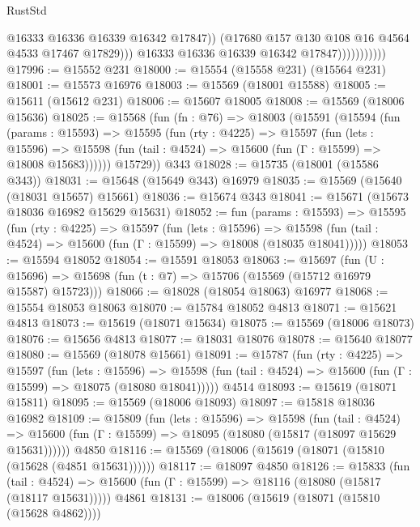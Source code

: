 \begin{lexlean}{RustStd}
\begin{coremodule}
{\begin{coremodule}
{{{{{{{{{{{{{{{{{{{{{{{{{{{{{{{{{{{{{{{{{{{{{{{{{{{{{{{{{{{{                                  @16333
                                  @16336
                                  @16339
                                  @16342
                                  @17847))
                              (@17680 @157 @130 @108 @16 @4564 @4533 @17467 @17829)))
                          @16333
                          @16336
                          @16339
                          @16342
                          @17847)))))))))))
@17996 := @15552 @231
@18000 := @15554 (@15558 @231) (@15564 @231)
@18001 := @15573 @16976
@18003 := @15569 (@18001 @15588)
@18005 := @15611 (@15612 @231)
@18006 := @15607 @18005
@18008 := @15569 (@18006 @15636)
@18025 := @15568
    (fun (fn : @76) =>
    @18003
      (@15591
        (@15594
          (fun (params : @15593) =>
          @15595
            (fun (rty : @4225) =>
            @15597
              (fun (lets : @15596) =>
              @15598 (fun (tail : @4524) => @15600 (fun (Γ : @15599) => @18008 @15683))))))
        @15729))
    @343
@18028 := @15735 (@18001 (@15586 @343))
@18031 := @15648 (@15649 @343) @16979
@18035 := @15569 (@15640 (@18031 @15657) @15661)
@18036 := @15674 @343
@18041 := @15671 (@15673 @18036 @16982 @15629 @15631)
@18052 := fun (params : @15593) =>
  @15595
    (fun (rty : @4225) =>
    @15597
      (fun (lets : @15596) =>
      @15598 (fun (tail : @4524) => @15600 (fun (Γ : @15599) => @18008 (@18035 @18041)))))
@18053 := @15594 @18052
@18054 := @15591 @18053
@18063 := @15697
    (fun (U : @15696) => @15698 (fun (t : @7) => @15706 (@15569 (@15712 @16979 @15587) @15723)))
@18066 := @18028 (@18054 @18063) @16977
@18068 := @15554 @18053 @18063
@18070 := @15784 @18052 @4813
@18071 := @15621 @4813
@18073 := @15619 (@18071 @15634)
@18075 := @15569 (@18006 @18073)
@18076 := @15656 @4813
@18077 := @18031 @18076
@18078 := @15640 @18077
@18080 := @15569 (@18078 @15661)
@18091 := @15787
    (fun (rty : @4225) =>
    @15597
      (fun (lets : @15596) =>
      @15598 (fun (tail : @4524) => @15600 (fun (Γ : @15599) => @18075 (@18080 @18041)))))
    @4514
@18093 := @15619 (@18071 @15811)
@18095 := @15569 (@18006 @18093)
@18097 := @15818 @18036 @16982
@18109 := @15809
    (fun (lets : @15596) =>
    @15598
      (fun (tail : @4524) =>
      @15600 (fun (Γ : @15599) => @18095 (@18080 (@15817 (@18097 @15629 @15631))))))
    @4850
@18116 := @15569 (@18006 (@15619 (@18071 (@15810 (@15628 (@4851 @15631))))))
@18117 := @18097 @4850
@18126 := @15833
    (fun (tail : @4524) => @15600 (fun (Γ : @15599) => @18116 (@18080 (@15817 (@18117 @15631)))))
    @4861
@18131 := @18006 (@15619 (@18071 (@15810 (@15628 @4862))))
}}}}}}}}}}}}}}}}}}}}}}}}}}}}}}}}}}}}}}}}}}}}}}}}}}}}}}}}}}}}
\end{coremodule}}
\end{coremodule}
\end{lexlean}
